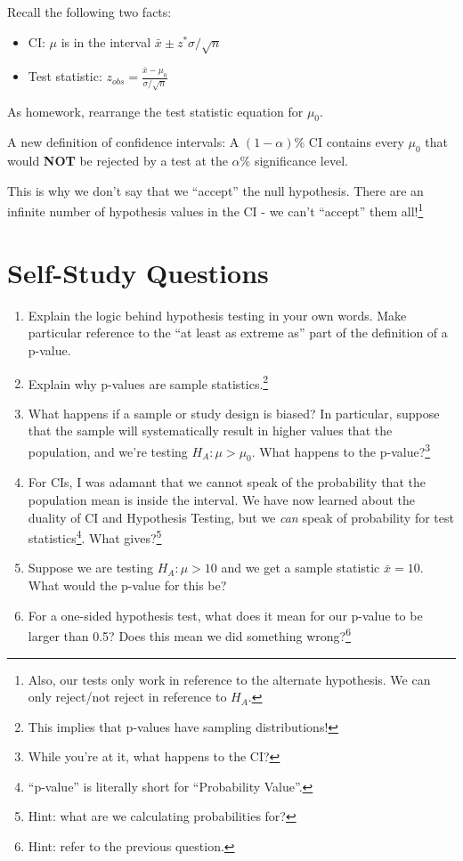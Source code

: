 \documentclass[
  letterpaper,
  DIV=11,
  numbers=noendperiod]{scrreprt}
\providecommand{\tightlist}{%
  \setlength{\itemsep}{0pt}\setlength{\parskip}{0pt}}\usepackage{longtable,booktabs,array}
\begin{document}
Recall the following two facts:

\begin{itemize}
\tightlist
\item
  CI: \(\mu\) is in the interval \(\bar x \pm z^*\sigma/\sqrt{n}\)
\item
  Test statistic: \(z_{obs} = \frac{\bar x - \mu_0}{\sigma/\sqrt{n}}\)
\end{itemize}

As homework, rearrange the test statistic equation for \(\mu_0\).

A new definition of confidence intervals: A \((1-\alpha)\)\% CI contains
every \(\mu_0\) that would \textbf{NOT} be rejected by a test at the
\(\alpha\)\% significance level.

This is why we don't say that we ``accept'' the null hypothesis. There
are an infinite number of hypothesis values in the CI - we can't
``accept'' them all!\footnote{Also, our tests only work in reference to
  the alternate hypothesis. We can only reject/not reject in reference
  to \(H_A\).}

\hypertarget{self-study-questions-3}{%
\section{Self-Study Questions}\label{self-study-questions-3}}

\begin{enumerate}
\def\labelenumi{\arabic{enumi}.}
\tightlist
\item
  Explain the logic behind hypothesis testing in your own words. Make
  particular reference to the ``at least as extreme as'' part of the
  definition of a p-value.
\item
  Explain why p-values are sample statistics.\footnote{This implies that
    p-values have sampling distributions!}
\item
  What happens if a sample or study design is biased? In particular,
  suppose that the sample will systematically result in higher values
  that the population, and we're testing \(H_A:\mu > \mu_0\). What
  happens to the p-value?\footnote{While you're at it, what happens to
    the CI?}
\item
  For CIs, I was adamant that we cannot speak of the probability that
  the population mean is inside the interval. We have now learned about
  the duality of CI and Hypothesis Testing, but we \emph{can} speak of
  probability for test statistics\footnote{``p-value'' is literally
    short for ``Probability Value''.}. What gives?\footnote{Hint: what
    are we calculating probabilities for?}
\item
  Suppose we are testing \(H_A:\mu > 10\) and we get a sample statistic
  \(\bar x = 10\). What would the p-value for this be?
\item
  For a one-sided hypothesis test, what does it mean for our p-value to
  be larger than 0.5? Does this mean we did something wrong?\footnote{Hint:
    refer to the previous question.}
\end{enumerate}
\end{document}
